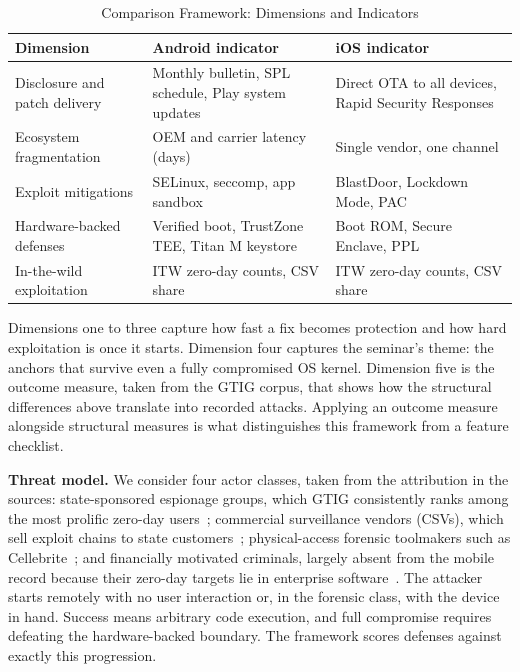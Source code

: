 \documentclass[conference,a4paper]{IEEEtran}
\begin{document}
\begin{table}[htbp]
\caption{Comparison Framework: Dimensions and Indicators}
\begin{center}
\begin{tabular}{@{}p{1.55cm}p{2.9cm}p{2.9cm}@{}}
\toprule
\textbf{Dimension} & \textbf{Android indicator} & \textbf{iOS indicator} \\
\midrule
Disclosure and patch delivery & Monthly bulletin, SPL schedule, Play system updates & Direct OTA to all devices, Rapid Security Responses \\
Ecosystem fragmentation & OEM and carrier latency (days) & Single vendor, one channel \\
Exploit mitigations & SELinux, seccomp, app sandbox & BlastDoor, Lockdown Mode, PAC \\
Hardware-backed defenses & Verified boot, TrustZone TEE, Titan M keystore & Boot ROM, Secure Enclave, PPL \\
In-the-wild exploitation & ITW zero-day counts, CSV share & ITW zero-day counts, CSV share \\
\bottomrule
\end{tabular}
\label{tab:framework}
\end{center}
\end{table}

Dimensions one to three capture how fast a fix becomes protection and how
hard exploitation is once it starts. Dimension four captures the seminar's
theme: the anchors that survive even a fully compromised OS kernel.
Dimension five is the outcome measure, taken from the GTIG corpus, that
shows how the structural differences above translate into recorded
attacks. Applying an outcome measure alongside structural measures is what
distinguishes this framework from a feature checklist.

\textbf{Threat model.} We consider four actor classes, taken from the
attribution in the sources: state-sponsored espionage groups, which GTIG
consistently ranks among the most prolific zero-day
users~\cite{gtig2023review}; commercial surveillance vendors (CSVs),
which sell exploit chains to state customers~\cite{marczak2021forcedentry,
marczak2025graphite}; physical-access forensic toolmakers such as
Cellebrite~\cite{charrier2025zeroday}; and financially motivated
criminals, largely absent from the mobile record because their zero-day
targets lie in enterprise software~\cite{gtig2026review}. The attacker
starts remotely with no user interaction or, in the forensic class, with
the device in hand. Success means arbitrary code execution, and full
compromise requires defeating the hardware-backed boundary. The framework
scores defenses against exactly this progression.
\end{document}
